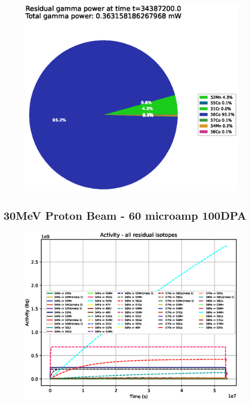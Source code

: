 \begin{figure}[!htb]
\centering
\includegraphics[width=0.7\linewidth]{chapters/results_activity_code/fe_100dpa/endofbeam/25MeV_0500_34387200.eps}
\caption{}
\label{fig:5mev-proton-100dpa}
\end{figure}



\clearpage
\FloatBarrier
\subsection{30MeV Proton Beam - 60 microamp 100DPA}

\begin{figure}[!htb]
\centering
\includegraphics[width=0.7\linewidth]{chapters/results_activity_code/fe_100dpa/by_isotope/30MeV_all_radioactive_isotopes.eps}
\caption{}
\label{fig:5mev-proton-100dpa-activity}
\end{figure}

